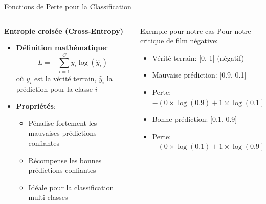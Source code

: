 \documentclass[aspectratio=169,11pt]{beamer}
\begin{document}
\begin{frame}{Fonctions de Perte pour la Classification}
    \begin{columns}
        \begin{column}{0.55\textwidth}
            \textbf{Entropie croisée (Cross-Entropy)}
            \begin{itemize}
                \item \textbf{Définition mathématique}:
                \begin{equation}
                L = -\sum_{i=1}^{C} y_i \log(\hat{y}_i)
                \end{equation}
                où $y_i$ est la vérité terrain, $\hat{y}_i$ la prédiction pour la classe $i$
                \vspace{0.3cm}
                \item \textbf{Propriétés}:
                \begin{itemize}
                    \item Pénalise fortement les mauvaises prédictions confiantes
                    \item Récompense les bonnes prédictions confiantes
                    \item Idéale pour la classification multi-classes
                \end{itemize}
            \end{itemize}
        \end{column}
        \begin{column}{0.45\textwidth}
            \begin{exampleblock}{Exemple pour notre cas}
                Pour notre critique de film négative:
                \begin{itemize}
                    \item Vérité terrain: [0, 1] (négatif)
                    \item Mauvaise prédiction: [0.9, 0.1]
                    \item Perte: $-(0 \times \log(0.9) + 1 \times \log(0.1)) \approx 2.3$
                    \vspace{0.3cm}
                    \item Bonne prédiction: [0.1, 0.9]
                    \item Perte: $-(0 \times \log(0.1) + 1 \times \log(0.9)) \approx 0.1$
                \end{itemize}
            \end{exampleblock}
        \end{column}
    \end{columns}
\end{frame}
\end{document}
